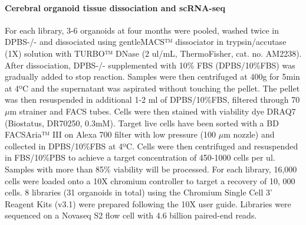\paragraph{Cerebral organoid tissue dissociation and scRNA-seq}
For each library, 3-6 organoids at four months were pooled, washed twice in DPBS-/- and dissociated using gentleMACS™ dissociator in trypsin/accutase (1X) solution with TURBO™ DNase (2 ul/mL, ThermoFisher, cat. no. AM2238). After dissociation, DPBS-/- supplemented with 10\% FBS (DPBS/10\%FBS) was gradually added to stop reaction. Samples were then centrifuged at 400g for 5min at 4ºC and the supernatant was aspirated without touching the pellet. The pellet was then resuspended in additional 1-2 ml of DPBS/10\%FBS, filtered through 70 $\mu$m strainer and FACS tubes. Cells were then stained with viability dye DRAQ7 (Biostatus, DR70250, 0.3mM). Target live cells have been sorted with a BD FACSAria™ III on Alexa 700 filter with low pressure (100 $\mu$m nozzle) and collected in DPBS/10\%FBS at 4ºC. Cells were then centrifuged and resuspended in FBS/10\%PBS to achieve a target concentration of 450-1000 cells per ul. Samples with more than 85\% viability will be processed. For each library, 16,000 cells were loaded onto a 10X chromium controller to target a recovery of 10, 000 cells. 8 libraries (31 organoids in total) using the Chromium Single Cell 3' Reagent Kits (v3.1) were prepared following the 10X user guide. Libraries were sequenced on a Novaseq S2 flow cell with 4.6 billion paired-end reads.


